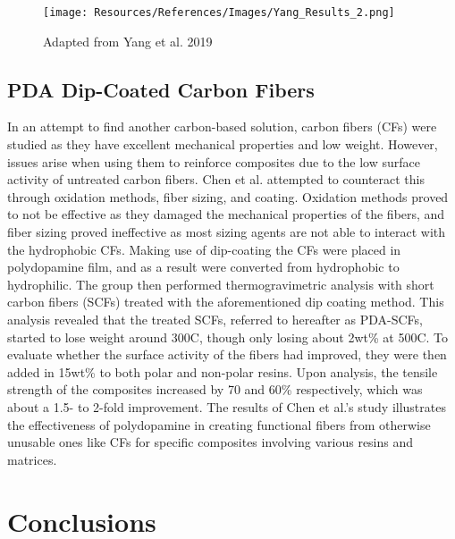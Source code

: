 \documentclass[12pt]{article}
\begin{document}
\begin{multicols}{2}
\begin{figure}[H]
    \centering
    \texttt{[image: Resources/References/Images/Yang\_Results\_2.png]}
    \caption{\scriptsize{Adapted from Yang et al. 2019 \citep{Yang2019}}}
    \label{fig:Yang_Results_2}
\end{figure}

\subsection{PDA Dip-Coated Carbon Fibers}

\indent In an attempt to find another carbon-based solution, carbon fibers (CFs) were studied as they have excellent mechanical properties and low weight. However, issues arise when using them to reinforce composites due to the low surface activity of untreated carbon fibers. Chen et al. \citep{ShushengChen2014} attempted to counteract this through oxidation methods, fiber sizing, and coating. Oxidation methods proved to not be effective as they damaged the mechanical properties of the fibers, and fiber sizing proved ineffective as most sizing agents are not able to interact with the hydrophobic CFs. Making use of dip-coating the CFs were placed in polydopamine film, and as a result were converted from hydrophobic to hydrophilic. \citep{ShushengChen2014} The group then performed thermogravimetric analysis with short carbon fibers (SCFs) treated with the aforementioned dip coating method. This analysis revealed that the treated SCFs, referred to hereafter as PDA-SCFs, started to lose weight around 300\degree C, though only losing about 2wt\% at 500\degree C. \citep{ShushengChen2014} To evaluate whether the surface activity of the fibers had improved, they were then added in 15wt\% to both polar and non-polar resins. Upon analysis, the tensile strength of the composites increased by 70 and 60\% respectively, which was about a 1.5- to 2-fold improvement. \citep{ShushengChen2014} The results of Chen et al.'s \citep{ShushengChen2014} study illustrates the effectiveness of polydopamine in creating functional fibers from otherwise unusable ones like CFs for specific composites involving various resins and matrices. 

\section{Conclusions}


\end{multicols}
\end{document}
